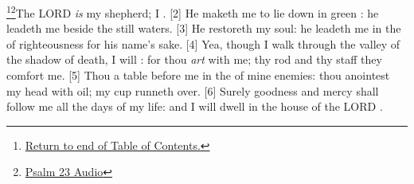 \footnote{\textcolor[cmyk]{0.99998,1,0,0}{\hyperlink{TOC}{Return to end of Table of Contents.}}}\footnote{\href{https://audiobible.com/bible}{\textcolor[cmyk]{0.99998,1,0,0}{Psalm 23 Audio}}}\textcolor[cmyk]{0.99998,1,0,0}{The LORD \emph{is} my shepherd; I .}
[2] \textcolor[cmyk]{0.99998,1,0,0}{He maketh me to lie down in green : he leadeth me beside the still waters.}
[3] \textcolor[cmyk]{0.99998,1,0,0}{He restoreth my soul: he leadeth me in the  of righteousness for his name's sake.}
[4] \textcolor[cmyk]{0.99998,1,0,0}{Yea, though I walk through the valley of the shadow of death, I will : for thou \emph{art} with me; thy rod and thy staff they comfort me.}
[5] \textcolor[cmyk]{0.99998,1,0,0}{Thou  a table before me in the  of mine enemies: thou anointest my head with oil; my cup runneth over.}
[6] \textcolor[cmyk]{0.99998,1,0,0}{Surely goodness and mercy shall follow me all the days of my life: and I will dwell in the house of the LORD .}